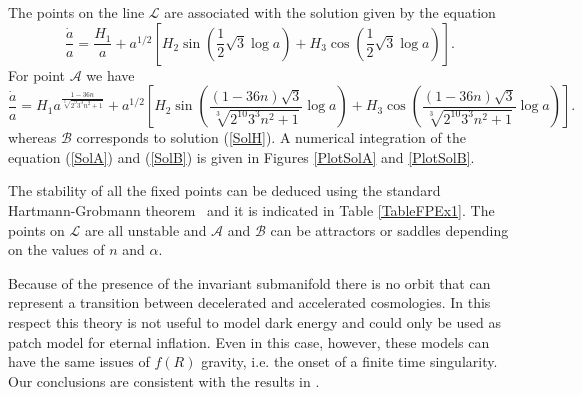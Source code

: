 \documentclass[a4paper,aps,onecolumn,nofootinbib]{revtex4}
\def\rf#1{(\ref{#1})}
\begin{document}
The points on the line $\mathcal{L}$ are associated 
with the solution given by the equation
\begin{equation}\label{SolA}
\frac{\dot{a}}{a}=\frac{H_1}{a}+a^{1/2} \left[H_2 \sin \left(\frac{1}{2}\sqrt{3} \log a\right)+H_3 \cos\left(\frac{1}{2}\sqrt{3} \log a\right)\right].
\end{equation}
For point $\mathcal{A}$  we have 
\begin{equation}\label{SolB}
\frac{\dot{a}}{a}=H_1a^\frac{1-36 n}{\sqrt[3]{2^9 3^3 n^2+1}}+a^{1/2} \left[H_2 \sin \left(\frac{(1-36 n)\sqrt{3}}{\sqrt[3]{2^{10} 3^3 n^2+1}}  \log a\right)+H_3 \cos\left(\frac{(1-36 n)\sqrt{3}}{\sqrt[3]{2^{10} 3^3 n^2+1}} \log a\right)\right].
\end{equation}
whereas  $\mathcal{B}$  corresponds to solution \rf{SolH}. A numerical integration of the equation \rf{SolA} and \rf{SolB} is given in Figures \ref{PlotSolA} and \ref{PlotSolB}.

The stability of all the fixed points  can be deduced using the standard Hartmann-Grobmann theorem~\cite{Hartman-Grobman} and it is indicated in Table \ref{TableFPEx1}. The points on $\mathcal{L}$ are all unstable and $\mathcal{A}$ and $\mathcal{B}$ can be attractors or saddles depending on the values of $n$ and $\alpha$. 

Because of the presence of the invariant submanifold there is no orbit that can represent a transition between decelerated and accelerated cosmologies. In this respect this theory is not useful to model dark energy and could only be used as patch model for eternal inflation. Even in this case, however, these models can have the same issues of $f(R)$ gravity, i.e. the onset of a finite time singularity.  Our conclusions are consistent with the results in \cite{DeFelice:2009aj,Davis:2007id}. 
\end{document}
